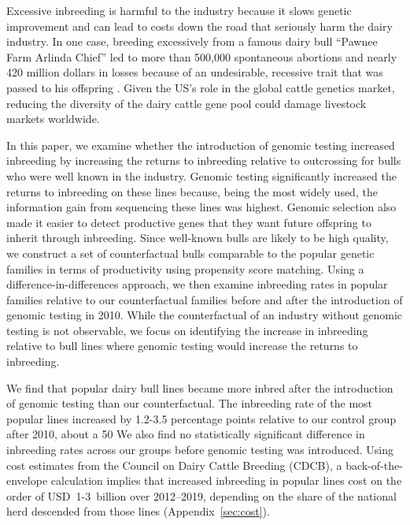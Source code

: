 \documentclass[12pt,letterpaper]{article}
\begin{document}
Excessive inbreeding is harmful to the industry because it slows genetic improvement and can lead to costs down the road that seriously harm the dairy industry.
In one case, breeding excessively from a famous dairy bull ``Pawnee Farm Arlinda Chief'' led to more than 500,000 spontaneous abortions and nearly 420 million dollars in losses because of an undesirable, recessive trait that was passed to his offspring \citep{Adams2016}. 
Given the US's role in the global cattle genetics market, reducing the diversity of the dairy cattle gene pool could damage livestock markets worldwide.

In this paper, we examine whether the introduction of genomic testing increased inbreeding by increasing the returns to inbreeding relative to outcrossing for bulls who were well known in the industry.
Genomic testing significantly increased the returns to inbreeding on these lines because, being the most widely used, the information gain from sequencing these lines was highest.
Genomic selection also made it easier to detect productive genes that they want future offspring to inherit through inbreeding.
Since well-known bulls are likely to be high quality, we construct a set of counterfactual bulls comparable to the popular genetic families in terms of productivity using propensity score matching.
Using a difference-in-differences approach, we then examine inbreeding rates in popular families relative to our counterfactual families before and after the introduction of genomic testing in 2010.
While the counterfactual of an industry without genomic testing is not observable, we focus on identifying the increase in inbreeding relative to bull lines where genomic testing would increase the returns to inbreeding.

We find that popular dairy bull lines became more inbred after the introduction of genomic testing than our counterfactual.
The inbreeding rate of the most popular lines increased by 1.2-3.5 percentage points relative to our control group after 2010, about a 50%
We also find no statistically significant difference in inbreeding rates across our groups before genomic testing was introduced.
Using cost estimates from the Council on Dairy Cattle Breeding (CDCB), a back-of-the-envelope calculation implies that increased inbreeding in popular lines cost on the order of USD~1-3~billion over 2012--2019, depending on the share of the national herd descended from those lines (Appendix~\ref{sec:cost}).
\end{document}
